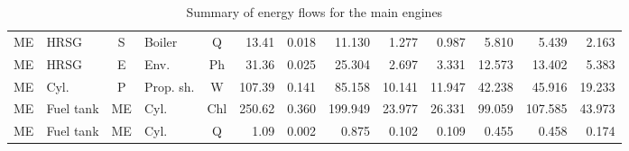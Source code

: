 \documentclass[preprint,12pt]{elsarticle}
\begin{document}
\begin{table}[hbp!]
{\begin{tabular}{clclcrrrrrrrr}
ME & HRSG & S & Boiler & Q & 13.41 & 0.018 & 11.130 & 1.277 & 0.987 & 5.810 & 5.439 & 2.163\\
ME & HRSG & E & Env. & Ph & 31.36 & 0.025 & 25.304 & 2.697 & 3.331 & 12.573 & 13.402 & 5.383\\
ME & Cyl. & P & Prop. sh. & W & 107.39 & 0.141 & 85.158 & 10.141 & 11.947 & 42.238 & 45.916 & 19.233\\
ME & Fuel tank & ME & Cyl. & Chl & 250.62 & 0.360 & 199.949 & 23.977 & 26.331 & 99.059 & 107.585 & 43.973\\
ME & Fuel tank & ME & Cyl. & Q & 1.09 & 0.002 & 0.875 & 0.102 & 0.109 & 0.455 & 0.458 & 0.174\\
\bottomrule
\end{tabular}}
\caption{Summary of energy flows for the main engines}
\label{tab:flows:en:ME}
\end{table}
\end{document}
